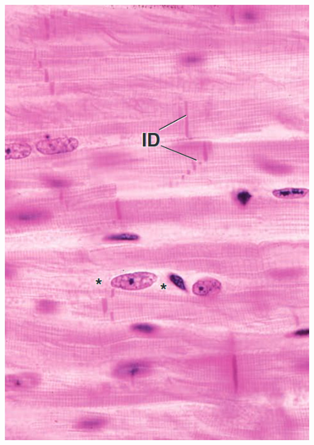\begin{itemize}
\begin{center}
    \includegraphics[scale=0.18]{images/week-1-rp8.jpg}

\end{center}
\end{itemize}
